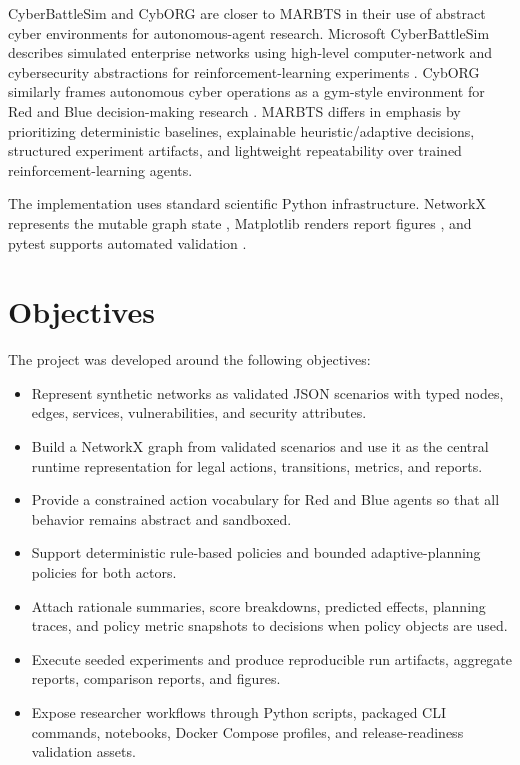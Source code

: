 \documentclass[conference]{IEEEtran}
\begin{document}
CyberBattleSim and CybORG are closer to MARBTS in their use of abstract cyber environments for autonomous-agent research. Microsoft CyberBattleSim describes simulated enterprise networks using high-level computer-network and cybersecurity abstractions for reinforcement-learning experiments \cite{cyberbattle}. CybORG similarly frames autonomous cyber operations as a gym-style environment for Red and Blue decision-making research \cite{cyborg}. MARBTS differs in emphasis by prioritizing deterministic baselines, explainable heuristic/adaptive decisions, structured experiment artifacts, and lightweight repeatability over trained reinforcement-learning agents.

The implementation uses standard scientific Python infrastructure. NetworkX represents the mutable graph state \cite{networkx}, Matplotlib renders report figures \cite{matplotlib}, and pytest supports automated validation \cite{pytest}.

\section{Objectives}
The project was developed around the following objectives:

\begin{itemize}
    \item Represent synthetic networks as validated JSON scenarios with typed nodes, edges, services, vulnerabilities, and security attributes.
    \item Build a NetworkX graph from validated scenarios and use it as the central runtime representation for legal actions, transitions, metrics, and reports.
    \item Provide a constrained action vocabulary for Red and Blue agents so that all behavior remains abstract and sandboxed.
    \item Support deterministic rule-based policies and bounded adaptive-planning policies for both actors.
    \item Attach rationale summaries, score breakdowns, predicted effects, planning traces, and policy metric snapshots to decisions when policy objects are used.
    \item Execute seeded experiments and produce reproducible run artifacts, aggregate reports, comparison reports, and figures.
    \item Expose researcher workflows through Python scripts, packaged CLI commands, notebooks, Docker Compose profiles, and release-readiness validation assets.
\end{itemize}
\end{document}
